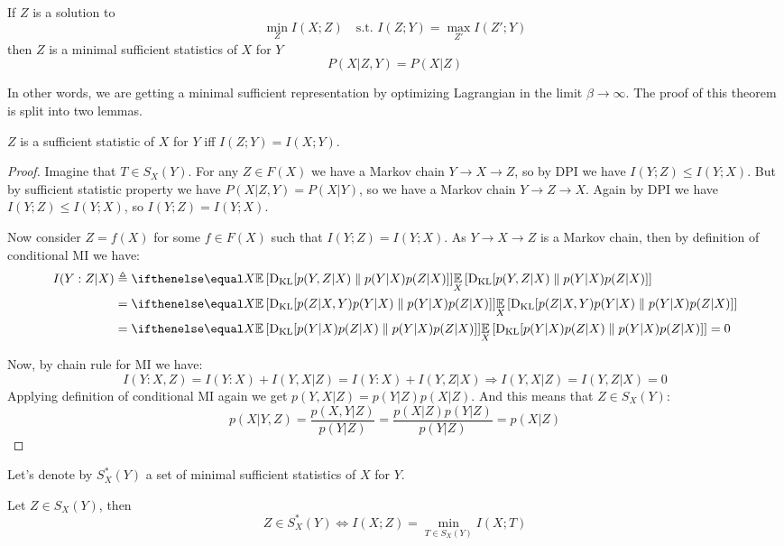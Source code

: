 \documentclass{article}
\begin{document}
\begin{proposition}
If $Z$ is a solution to
\[
\min_{Z} I(X; Z) \quad\text{s.t. } I(Z;Y) = \max_{Z'} I(Z'; Y)
\]
then $Z$ is a minimal sufficient statistics of $X$ for $Y$
\[
P(X|Z,Y) = P(X|Z)
\]
\end{proposition}

In other words, we are getting a minimal sufficient representation by optimizing Lagrangian in the limit $\beta \to \infty$.
The proof of this theorem is split into two lemmas.

\begin{lemma}
    $Z$ is a sufficient statistic of $X$ for $Y$ iff $I(Z;Y) = I(X;Y)$.
\end{lemma}

\begin{proof}
Imagine that $T \in S_X(Y)$.
For any $Z \in F(X)$ we have a Markov chain $Y \to X \to Z$, so by DPI we have $I(Y;Z) \leq I(Y;X)$.
But by sufficient statistic property we have $P(X|Z,Y) = P(X|Y)$, so we have a Markov chain $Y \to Z \to X$.
Again by DPI we have $I(Y;Z) \leq I(Y;X)$, so $I(Y;Z) = I(Y;X)$.

Now consider $Z = f(X)$ for some $f \in F(X)$ such that $I(Y;Z) = I(Y;X)$.
As $Y \to X \to Z$ is a Markov chain, then by definition of conditional MI we have:
\[
\begin{split}
I(Y:Z|X) &\triangleq \expect[X]{\kl{p(Y,Z|X)}{p(Y|X)p(Z|X)}} \\
&= \expect[X]{\kl{p(Z|X,Y)p(Y|X)}{p(Y|X)p(Z|X)}} \\
&= \expect[X]{\kl{p(Y|X)p(Z|X)}{p(Y|X)p(Z|X)}} = 0
\end{split}
\]

Now, by chain rule for MI we have:
\[
I(Y : X,Z) = I(Y : X) + I(Y,X|Z) = I(Y : X) + I(Y,Z|X) \Longrightarrow I(Y,X|Z) = I(Y,Z|X) = 0
\]
Applying definition of conditional MI again we get $p(Y,X|Z) = p(Y|Z)p(X|Z)$.
And this means that $Z \in S_X(Y)$:
\[
p(X|Y,Z) = \frac{p(X,Y|Z)}{p(Y|Z)} = \frac{p(X|Z) p(Y|Z)}{p(Y|Z)} = p(X|Z)
\]
\end{proof}

Let's denote by $S_X^*(Y)$ a set of minimal sufficient statistics of $X$ for $Y$.
\begin{lemma}
Let $Z \in S_X(Y)$, then
\[
Z \in S_X^*(Y) \Longleftrightarrow I(X;Z) = \min_{T \in S_X(Y)} I(X;T)
\]
\end{lemma}
\end{document}
